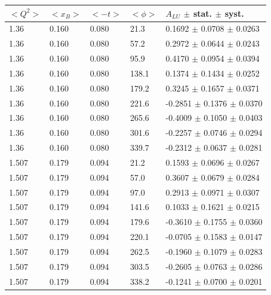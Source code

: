 \begin{table}[!h]
   \begin{center}
      \begin{tabular}{||l|l|l|l|l||}
         \hline
 $<Q^{2}>$ & $<x_{B}>$ & $<-t>$ & $<\phi>$ & $A_{LU}$ $\pm$ stat. $\pm$ syst.\\
         \hline
  1.36 & 0.160 & 0.080 &  21.3   &  0.1692   $\pm$ 0.0708    $\pm$  0.0263  \\
  1.36 & 0.160 & 0.080 &  57.2   &  0.2972   $\pm$ 0.0644    $\pm$  0.0243  \\
  1.36 & 0.160 & 0.080 &  95.9   &  0.4170   $\pm$ 0.0954    $\pm$  0.0394  \\
  1.36 & 0.160 & 0.080 &  138.1  &  0.1374   $\pm$ 0.1434    $\pm$  0.0252  \\
  1.36 & 0.160 & 0.080 &  179.2  &  0.3245   $\pm$ 0.1657    $\pm$  0.0371  \\
  1.36 & 0.160 & 0.080 &  221.6  & -0.2851   $\pm$ 0.1376    $\pm$  0.0370  \\
  1.36 & 0.160 & 0.080 &  265.6  & -0.4009   $\pm$ 0.1050    $\pm$  0.0403  \\
  1.36 & 0.160 & 0.080 &  301.6  & -0.2257   $\pm$ 0.0746    $\pm$  0.0294  \\
  1.36 & 0.160 & 0.080 &  339.7  & -0.2312   $\pm$ 0.0637    $\pm$  0.0281  \\
\hline                                                              
  1.507 & 0.179 & 0.094 & 21.2   &  0.1593   $\pm$ 0.0696    $\pm$  0.0267  \\
  1.507 & 0.179 & 0.094 & 57.0   &  0.3607   $\pm$ 0.0679    $\pm$  0.0284  \\
  1.507 & 0.179 & 0.094 & 97.0   &  0.2913   $\pm$ 0.0971    $\pm$  0.0307  \\
  1.507 & 0.179 & 0.094 & 141.6  &  0.1033   $\pm$ 0.1621    $\pm$  0.0215  \\
  1.507 & 0.179 & 0.094 & 179.6  & -0.3610   $\pm$ 0.1755    $\pm$  0.0360  \\
  1.507 & 0.179 & 0.094 & 220.1  & -0.0705   $\pm$ 0.1583    $\pm$  0.0147  \\
  1.507 & 0.179 & 0.094 & 262.5  & -0.1960   $\pm$ 0.1079    $\pm$  0.0283  \\
  1.507 & 0.179 & 0.094 & 303.5  & -0.2605   $\pm$ 0.0763    $\pm$  0.0286  \\
  1.507 & 0.179 & 0.094 & 338.2  & -0.1241   $\pm$ 0.0700    $\pm$  0.0201  \\
\hline                                                                         

\end{tabular}
\end{center}
\end{table}
